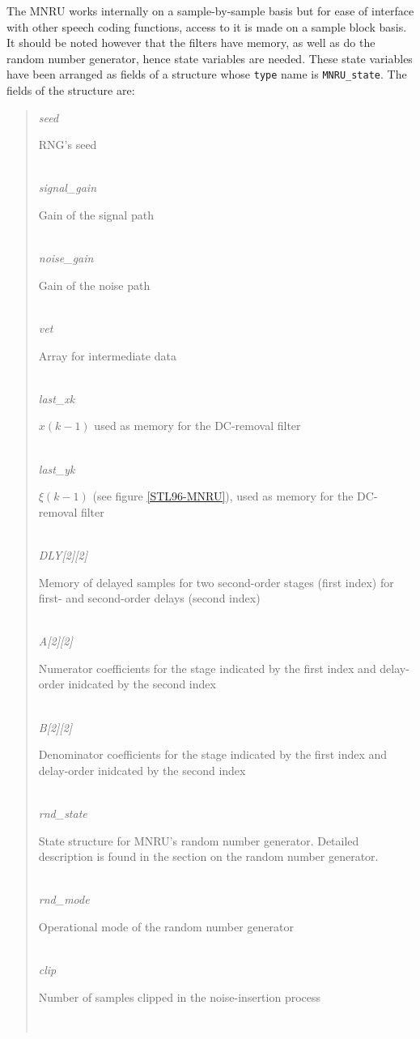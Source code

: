 The MNRU works internally on a sample-by-sample basis but for ease of interface with other speech coding functions,
access to it is made on a sample block basis.
It should be noted however that the filters have memory, as well as do the random number generator, hence state
variables are needed.
These state variables have been arranged as fields of a structure whose {\tt type} name is {\tt MNRU\_state}.
The fields of the structure are:
\begin{quote} \normalsize
 {\em seed}     \hfill \parbox{100mm}{\SF RNG's seed }\\
 {\em signal\_gain}     \hfill \parbox{100mm}{\SF Gain of the signal path }\\
 {\em noise\_gain}      \hfill \parbox{100mm}{\SF Gain of the noise path }\\
 {\em vet}      \hfill \parbox{100mm}{\SF Array for intermediate data }\\
 {\em last\_xk} \hfill \parbox[t]{100mm}{\SF $x(k-1)$ used as memory for
                            the DC-removal filter }\\
 {\em last\_yk}\hfill \parbox[t]{100mm}{\SF $\xi(k-1)$ (see figure
                            \ref{STL96-MNRU}), used as memory for the
                            DC-removal filter}\\
 {\em DLY[2][2]}      \hfill \parbox[t]{100mm}{\SF Memory of delayed
                            samples for two second-order stages (first
                            index) for first- and second-order delays
                            (second index)}\\
 {\em A[2][2]}  \hfill \parbox[t]{100mm}{\SF Numerator coefficients for
                            the stage indicated by the first index and
                            delay-order inidcated by the second index}\\
 {\em B[2][2]}  \hfill \parbox[t]{100mm}{\SF Denominator coefficients for
                            the stage indicated by the first index and
                            delay-order inidcated by the second index}\\
 {\em rnd\_state}  \hfill \parbox[t]{100mm}{\SF State structure for MNRU's
                            random number generator. Detailed
                            description is found in the section on the
                            random number generator.}\\
 {\em rnd\_mode}   \hfill \parbox[t]{100mm}{\SF Operational mode of the
                            random number generator}\\
 {\em clip}     \hfill \parbox[t]{100mm}{\SF Number of samples clipped in
                            the noise-insertion process}\\
\end{quote}

